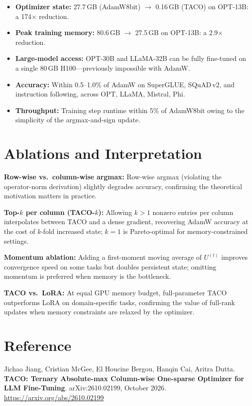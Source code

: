 \documentclass[10pt,twocolumn]{article}
\begin{document}
\begin{itemize}[itemsep=2pt,parsep=0pt]
  \item \textbf{Optimizer state:} 27.7\,GB (AdamW8bit) $\to$ 0.16\,GB (TACO)
    on OPT-13B: a 174$\times$ reduction.
  \item \textbf{Peak training memory:} 80.6\,GB $\to$ 27.5\,GB on OPT-13B:
    a 2.9$\times$ reduction.
  \item \textbf{Large-model access:} OPT-30B and LLaMA-32B can be fully
    fine-tuned on a single 80\,GB H100---previously impossible with AdamW.
  \item \textbf{Accuracy:} Within 0.5--1.0\% of AdamW on SuperGLUE, SQuAD\,v2,
    and instruction following, across OPT, LLaMA, Mistral, Phi.
  \item \textbf{Throughput:} Training step runtime within 5\% of AdamW8bit
    owing to the simplicity of the argmax-and-sign update.
\end{itemize}

\section{Ablations and Interpretation}

\textbf{Row-wise vs.\ column-wise argmax:} Row-wise argmax (violating the
operator-norm derivation) slightly degrades accuracy, confirming the
theoretical motivation matters in practice.

\textbf{Top-$k$ per column (TACO-$k$):} Allowing $k>1$ nonzero entries per
column interpolates between TACO and a dense gradient, recovering AdamW accuracy
at the cost of $k$-fold increased state; $k=1$ is Pareto-optimal for
memory-constrained settings.

\textbf{Momentum ablation:} Adding a first-moment moving average of $U^{(t)}$
improves convergence speed on some tasks but doubles persistent state; omitting
momentum is preferred when memory is the bottleneck.

\textbf{TACO vs.\ LoRA:} At equal GPU memory budget, full-parameter TACO
outperforms LoRA on domain-specific tasks, confirming the value of full-rank updates
when memory constraints are relaxed by the optimizer.

\section*{Reference}

Jichao Jiang, Cristian McGee, El Houcine Bergou, Hanqin Cai, Aritra Dutta.
\textbf{TACO: Ternary Absolute-max Column-wise One-sparse Optimizer for LLM Fine-Tuning}.
arXiv:2610.02199, October 2026.\\
\url{https://arxiv.org/abs/2610.02199}
\end{document}

